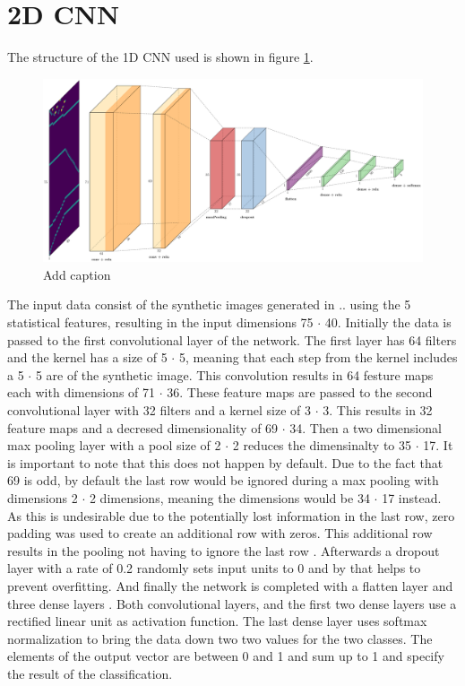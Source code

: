 \section{2D CNN}
The structure of the 1D CNN used is shown in figure \ref{fig:2dCnnStructure}.
\begin{figure}[H]
	\centering
	\includegraphics[width=15cm]{images/2dCnnStructure.png}
	\caption[Bild kurz]{Add caption}
	\label{fig:2dCnnStructure}
\end{figure}
The input data consist of the synthetic images generated in ..  using the 5 statistical features, resulting in the input dimensions 75 $\cdot$ 40. Initially the data is passed to the first convolutional layer of the network. The first layer has 64 filters and the kernel has a size of 5 $\cdot$ 5, meaning that each step from the kernel includes a 5 $\cdot$ 5 are of the synthetic image. This convolution results in 64 festure maps each with dimensions of 71 $\cdot$ 36. These feature maps are passed to the second convolutional layer with 32 filters and a kernel size of 3 $\cdot$ 3. This results in 32 feature maps and a decresed dimensionality of 69 $\cdot$ 34. Then a two dimensional max pooling layer with a pool size of 2 $\cdot$ 2 reduces the dimensinalty to 35 $\cdot$ 17. It is important to note that this does not happen by default. Due to the fact that 69 is odd, by default the last row would be ignored during a max pooling with dimensions 2 $\cdot$ 2 dimensions, meaning the dimensions would be 34 $\cdot$ 17 instead. As this is undesirable due to the potentially lost information in the last row, zero padding was used to create an additional row with zeros. This additional row results in the pooling not having to ignore the last row . Afterwards a dropout layer with a rate of 0.2 randomly sets input units to 0 and by that helps to prevent overfitting. And finally the network is completed with a flatten layer and three dense layers . Both convolutional layers, and the first two dense layers use a rectified linear unit as activation function. The last dense layer uses softmax normalization to bring the data down two two values for the two classes. The elements of the output vector are between 0 and 1 and sum up to 1 and specify the result of the classification.  


